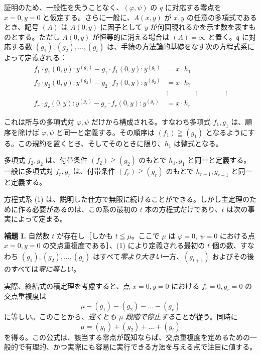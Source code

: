 証明のため、一般性を失うことなく、\((\varphi,\psi)\) の \(q\) に対応する零点を \(x=0, y=0\) と仮定する。さらに一般に、\(A(x,y)\) が \(x,y\) の任意の多項式であるとき、記号 \((A)\) は \(A(0,y)\) に因子として \(y\) が何回現れるかを示す数を表すものとする。ただし \(A(0,y)\) が恒等的に消える場合は \((A)=\infty\) と置く。\(\mathfrak{q}\) に対応する数 \((g_1),(g_2),\ldots,(g_t)\) は、手続の方法論的基礎をなす次の方程式系によって定義される：
\begin{equation}
\tag{1}
\begin{aligned}
f_1\cdot g_1(0,y):y^{(g_1)} - g_1\cdot f_1(0,y):y^{(g_1)} &= x\cdot h_1\\
f_2\cdot g_2(0,y):y^{(g_2)} - g_2\cdot f_2(0,y):y^{(g_2)} &= x\cdot h_2\\
&\vdots \qquad\qquad\vdots\qquad\qquad\vdots\\
f_r\cdot g_r(0,y):y^{(g_r)} - g_r\cdot f_r(0,y):y^{(g_r)} &= x\cdot h_r
\end{aligned}
\end{equation}

これは所与の多項式対 \(\varphi,\psi\) だけから構成される。すなわち多項式 \(f_1,g_1\) は、順序を除けば \(\varphi,\psi\) と同一と定義する。その順序は \((f_1)\geqq(g_1)\) となるようにする。この規約を置くとき、そしてそのときに限り、\(h_1\) は整式となる。

多項式 \(f_2,g_2\) は、付帯条件 \((f_2)\geqq(g_2)\) のもとで \(h_1,g_1\) と同一と定義する。一般に多項式対 \(f_r,g_r\) は、付帯条件 \((f_r)\geqq(g_r)\) のもとで \(h_{r-1},g_{r-1}\) と同一と定義する。

方程式系 (1) は、説明した仕方で無限に続けることができる。しかし主定理のために作る必要があるのは、この系の最初の \(t\) 本の方程式だけであり、\(t\) は次の事実によって定まる。

\textbf{補題 I.} 自然数 \(t\) が存在し［しかも \(t\leqq\mu\)。ここで \(\mu\) は \(\varphi=0,\ \psi=0\) における点 \(x=0, y=0\) の交点重複度である］、(1) により定義される最初の \(t\) 個の数、すなわち \((g_1),(g_2),\ldots,(g_t)\) はすべて\emph{零より大きい}一方、\((g_{t+1})\) およびその後のすべては\emph{零に等しい}。

実際、終結式の積定理を考慮すると、点 \(x=0, y=0\) における \(f_r=0, g_r=0\) の交点重複度は
\[
\mu-(g_1)-(g_2)-\ldots-(g_r)
\]
に等しい。このことから、\emph{遅くとも \(\mu\) 段階で停止する}ことが従う。同時に
\begin{equation}
\tag{2}
\mu=(g_1)+(g_2)+\ldots+(g_t)
\end{equation}
を得る。この公式は、該当する零点が既知ならば、交点重複度を定めるための一般的で有理的、かつ実際にも容易に実行できる方法を与える点で注目に値する。

